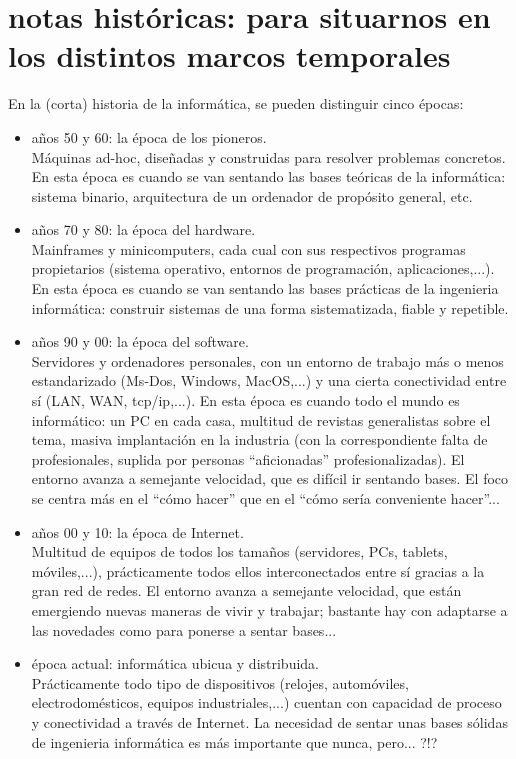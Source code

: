 \documentclass[spanish,12pt,a4paper,final,oneside]{book}
\begin{document}
\section{notas históricas: para situarnos en los distintos marcos temporales}
En la (corta) historia de la informática, se pueden distinguir cinco épocas:
\begin{itemize}
\item años 50 y 60: la época de los pioneros. 
\\Máquinas ad-hoc, diseñadas y construidas para resolver problemas concretos. En esta época es cuando se van sentando las bases teóricas de la informática: sistema binario, arquitectura de un ordenador de propósito general, etc.
\item años 70 y 80: la época del hardware. 
\\Mainframes y minicomputers, cada cual con sus respectivos programas propietarios (sistema operativo, entornos de programación, aplicaciones,...). En esta época es cuando se van sentando las bases prácticas de la ingenieria informática: construir sistemas de una forma sistematizada, fiable y repetible.
\item años 90 y 00: la época del software. 
\\Servidores y ordenadores personales, con un entorno de trabajo más o menos estandarizado (Ms-Dos, Windows, MacOS,...) y una cierta conectividad entre sí (LAN, WAN, tcp/ip,...). En esta época es cuando todo el mundo es informático: un PC en cada casa, multitud de revistas generalistas sobre el tema, masiva implantación en la industria (con la correspondiente falta de profesionales, suplida por personas ``aficionadas'' profesionalizadas). El entorno avanza a semejante velocidad, que es difícil ir sentando bases. El foco se centra más en el ``cómo hacer'' que en el ``cómo sería conveniente hacer''...
\item años 00 y 10: la época de Internet. 
\\Multitud de equipos de todos los tamaños (servidores, PCs, tablets, móviles,...), prácticamente todos ellos interconectados entre sí gracias a la gran red de redes. El entorno avanza a semejante velocidad, que están emergiendo nuevas maneras de vivir y trabajar; bastante hay con adaptarse a las novedades como para ponerse a sentar bases...
\item época actual: informática ubicua y distribuida. 
\\Prácticamente todo tipo de dispositivos (relojes, automóviles, electrodomésticos, equipos industriales,...) cuentan con capacidad de proceso y conectividad a través de Internet. La necesidad de sentar unas bases sólidas de ingenieria informática es más importante que nunca, pero... ?!?
\end{itemize}
\end{document}
